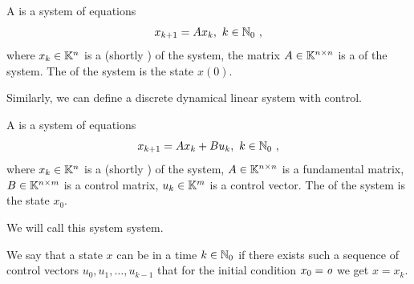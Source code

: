 \begin{definition}
	A  is a system of equations
	$$x_{k+1}=Ax_k,\ k\in\mathbb{N}_0\ ,$$
	where $x_k\in \mathbb{K}^n$ is a  (shortly ) of the system, the matrix $A\in \mathbb{K}^{n\times n}$ is a  of the system. The  of the system is the state $x(0)$.
\end{definition}

Similarly, we can define a discrete dynamical linear system with control.

\begin{definition}
	A  is a system of equations
	$$x_{k+1}=Ax_k+Bu_k,\ k\in\mathbb{N}_0\ ,$$
	where $x_k\in\mathbb{K}^n$ is a  (shortly ) of the system, $A\in\mathbb{K}^{n\times n}$ is a fundamental matrix, $B\in\mathbb{K}^{n\times m}$ is a control matrix, $u_k\in\mathbb{K}^m$ is a control vector. The  of the system is the state $x_0$.

	We will call this system  system.
\end{definition}

\begin{definition}
	We say that a state $x$ can be  in a time $k\in\mathbb{N}_0$ if there exists such a sequence of control vectors $u_0,u_1,\ldots,u_{k-1}$ that for the initial condition $x_0=\textit{o}$ we get $x=x_k$.
\end{definition}

